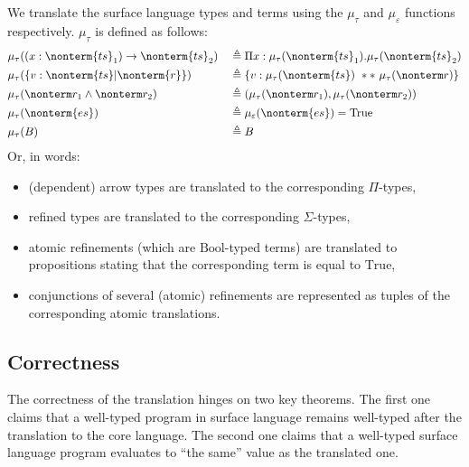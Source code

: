\documentclass[a4paper]{article}
\begin{document}
We translate the surface language types and terms using the $\mu_\tau$ and $\mu_\varepsilon$ functions respectively.
$\mu_\tau$ is defined as follows:
\begin{equation}
\begin{aligned}
  & \mu_\tau( (x : \nonterm{ts}_1) \rightarrow \nonterm{ts}_2)  && \triangleq \Pi x : \mu_\tau(\nonterm{ts}_1). \mu_\tau(\nonterm{ts}_2)  \\
  & \mu_\tau( \{ v : \nonterm{ts} | \nonterm{r} \})             && \triangleq \{ v : \mu_\tau(\nonterm{ts})\ **\ \mu_\tau(\nonterm r) \}  \\
  & \mu_\tau( \nonterm r_1 \land \nonterm r_2 )                 && \triangleq ( \mu_\tau(\nonterm r_1) , \mu_\tau(\nonterm r_2))          \\
  & \mu_\tau( \nonterm{es} )                                    && \triangleq \mu_\varepsilon(\nonterm{es}) = \text{True}                 \\
  & \mu_\tau(B)                                                 && \triangleq B                                                           \\
\end{aligned}
\end{equation}
Or, in words:
\begin{itemize}
  \item (dependent) arrow types are translated to the corresponding $\Pi$-types,
  \item refined types are translated to the corresponding $\Sigma$-types,
  \item atomic refinements (which are $\text{Bool}$-typed terms) are translated to propositions stating that the corresponding term is equal to $\text{True}$,
  \item conjunctions of several (atomic) refinements are represented as tuples of the corresponding atomic translations.
\end{itemize}


\subsection{Correctness}

The correctness of the translation hinges on two key theorems.
The first one claims that a well-typed program in surface language remains well-typed after the translation to the core language.
The second one claims that a well-typed surface language program evaluates to ``the same'' value as the translated one.
\end{document}
